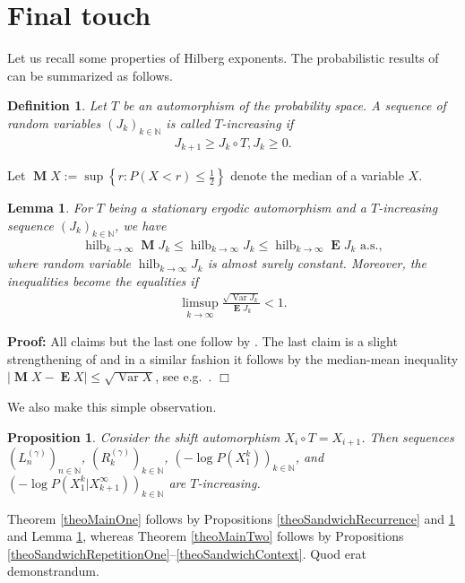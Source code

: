 \documentclass[a4paper]{article}
\newcommand{\abs}[1]{\left| #1 \right|}
\newcommand{\klam}[1]{\left\{ #1 \right\}}
\DeclareMathOperator*{\hilberg}{hilb}
\DeclareMathOperator{\var}{Var}
\DeclareMathOperator{\mean}{\mathbf{E}}
\DeclareMathOperator{\median}{\mathbf{M}}
\newtheorem{definition}{Definition}
\newtheorem{proposition}{Proposition}
\newtheorem{lemma}{Lemma}
\newenvironment*{proof}{\begin{trivlist}\item[]
\noindent\textbf{Proof:}}{$\Box$\par\end{trivlist}}
\begin{document}
\section{Final touch}
\label{secFinal}

Let us recall some properties of Hilberg exponents.  The probabilistic
results of \citep[Section 8.1]{Debowski21} can be summarized as
follows.
\begin{definition}
  Let $T$ be an automorphism of the probability space.  A sequence of
  random variables $(J_k)_{k\in\mathbb{N}}$ is called $T$-increasing
  if
  \begin{align}
    J_{k+1}\ge J_k\circ T,J_k\ge 0.
  \end{align}
\end{definition}
Let $\median X:=\sup \klam{r: P(X<r)\le \frac{1}{2}}$ denote the
median of a variable $X$.
\begin{lemma}
  \label{theoHilberg}
  For $T$ being a stationary ergodic automorphism and a $T$-increasing
  sequence $(J_k)_{k\in\mathbb{N}}$, we have
  \begin{align}
    \hilberg_{k\rightarrow\infty} \median J_k
    \le \hilberg_{k\rightarrow\infty} J_k 
    \le \hilberg_{k\rightarrow\infty} \mean J_k
    \text{ a.s.}, 
  \end{align}
  where random variable $\hilberg_{k\rightarrow\infty} J_k$ is almost
  surely constant. Moreover, the inequalities become the equalities if
  \begin{align}
    \limsup_{k\rightarrow\infty} \frac{\sqrt{\var J_k}}{\mean J_k}<1.
  \end{align}
\end{lemma}
\begin{proof}
  All claims but the last one follow by \citep[Theorems 8.3--8.5]{Debowski21}.
  The last claim is a slight strengthening of \citep[Theorem
  8.6]{Debowski21} and in a similar fashion it follows by the
  median-mean inequality $\abs{\median X-\mean X}\le \sqrt{\var X}$,
  see e.g.\ \citep[Theorem 3.17]{Debowski21}.
\end{proof}

We also make this simple observation.
\begin{proposition}
  \label{theoIncreasing}
  Consider the shift automorphism $X_i\circ T=X_{i+1}$. Then sequences
  $(L^{(\gamma)}_n)_{n\in\mathbb{N}}$,
  $(R^{(\gamma)}_k)_{k\in\mathbb{N}}$,
  $(-\log P(X_1^k))_{k\in\mathbb{N}}$, and
  $(-\log P(X_1^k|X_{k+1}^\infty))_{k\in\mathbb{N}}$ are
  $T$-increasing.
\end{proposition}
Theorem \ref{theoMainOne} follows by Propositions
\ref{theoSandwichRecurrence} and \ref{theoIncreasing} and Lemma
\ref{theoHilberg}, whereas Theorem \ref{theoMainTwo} follows by
Propositions
\ref{theoSandwichRepetitionOne}--\ref{theoSandwichContext}. Quod erat
demonstrandum.

% 

%


\end{document}
